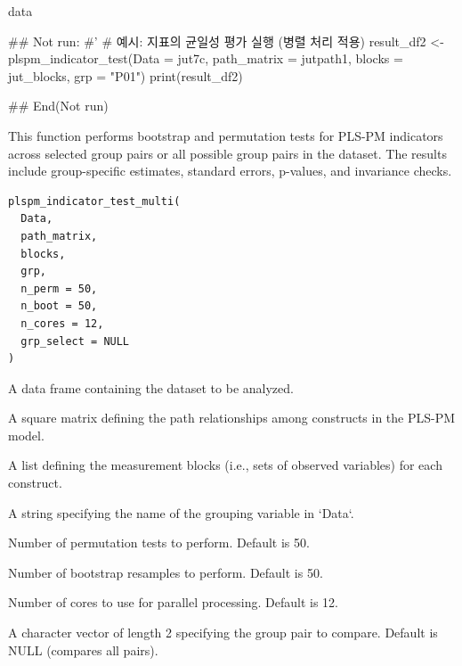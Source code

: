 \documentclass[a4paper]{book}
\begin{document}
%
\begin{Value}
data
\end{Value}
%
\begin{Examples}
\begin{ExampleCode}

## Not run: 
#'
# 예시: 지표의 균일성 평가 실행 (병렬 처리 적용)
result_df2 <- plspm_indicator_test(Data = jut7c, path_matrix = jutpath1, blocks = jut_blocks, grp = "P01")
print(result_df2)

## End(Not run)

\end{ExampleCode}
\end{Examples}
%
\begin{Description}
This function performs bootstrap and permutation tests for PLS-PM indicators across
selected group pairs or all possible group pairs in the dataset. The results include
group-specific estimates, standard errors, p-values, and invariance checks.
\end{Description}
%
\begin{Usage}
\begin{verbatim}
plspm_indicator_test_multi(
  Data,
  path_matrix,
  blocks,
  grp,
  n_perm = 50,
  n_boot = 50,
  n_cores = 12,
  grp_select = NULL
)
\end{verbatim}
\end{Usage}
%
\begin{Arguments}
\begin{ldescription}
\item[\code{Data}] A data frame containing the dataset to be analyzed.

\item[\code{path\_matrix}] A square matrix defining the path relationships among constructs in the PLS-PM model.

\item[\code{blocks}] A list defining the measurement blocks (i.e., sets of observed variables) for each construct.

\item[\code{grp}] A string specifying the name of the grouping variable in `Data`.

\item[\code{n\_perm}] Number of permutation tests to perform. Default is 50.

\item[\code{n\_boot}] Number of bootstrap resamples to perform. Default is 50.

\item[\code{n\_cores}] Number of cores to use for parallel processing. Default is 12.

\item[\code{grp\_select}] A character vector of length 2 specifying the group pair to compare. Default is NULL (compares all pairs).
\end{ldescription}
\end{Arguments}
\end{document}

